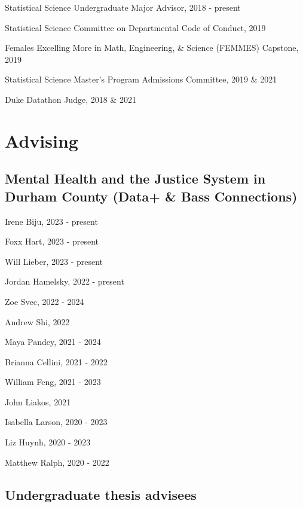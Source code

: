 \documentclass[11pt,dvipsnames]{article}
\renewenvironment{itemize}{
  \begin{list}{}{
    \setlength{\leftmargin}{1.5em}
  }
}{
  \end{list}
}
\begin{document}
Statistical Science Undergraduate Major Advisor, 2018 - present

Statistical Science Committee on Departmental Code of Conduct, 2019

Females Excelling More in Math, Engineering, \& Science (FEMMES)
Capstone, 2019

Statistical Science Master's Program Admissions Committee, 2019 \& 2021

Duke Datathon Judge, 2018 \& 2021

\section{Advising}\label{advising}

\subsection{Mental Health and the Justice System in Durham County (Data+
\& Bass
Connections)}\label{mental-health-and-the-justice-system-in-durham-county-data-bass-connections}

\begin{multicols}{2}
\begin{itemize}
\item Irene Biju, 2023 - present
\item Foxx Hart, 2023 - present
\item Will Lieber, 2023 - present
\item Jordan Hamelsky, 2022 - present
\item Zoe Svec, 2022 - 2024
\item Andrew Shi, 2022
\item Maya Pandey, 2021 - 2024
\item Brianna Cellini, 2021 - 2022
\item William Feng, 2021 - 2023
\item John Liakos, 2021
\item Isabella Larson, 2020 - 2023
\item Liz Huynh, 2020 - 2023
\item Matthew Ralph, 2020 - 2022
\end{itemize}
\end{multicols}

\subsection{Undergraduate thesis
advisees}\label{undergraduate-thesis-advisees}
\end{document}
